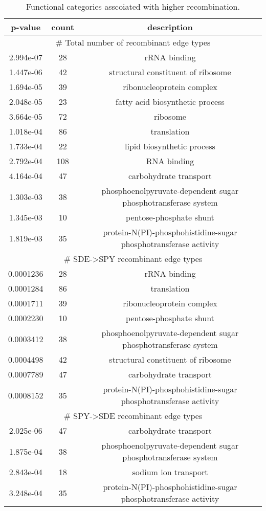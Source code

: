 \documentclass[english]{article}
\providecommand{\tabularnewline}{\\}
\begin{document}
\clearpage{}

%
\begin{table}
\caption{\label{tab:functional}Functional categories asscoiated with higher
recombination.}
\begin{tabular}{|c|c|c|}
\hline 
p-value & count & description\tabularnewline
\hline
\hline 
\multicolumn{3}{|c|}{\# Total number of recombinant edge types}\tabularnewline
\hline 
2.994e-07 &  28 & rRNA binding\tabularnewline
\hline 
1.447e-06 &  42 & structural constituent of ribosome\tabularnewline
\hline 
1.694e-05 &  39 & ribonucleoprotein complex\tabularnewline
\hline 
2.048e-05 &  23 & fatty acid biosynthetic process\tabularnewline
\hline 
3.664e-05 &  72 & ribosome\tabularnewline
\hline 
1.018e-04 &  86 & translation\tabularnewline
\hline 
1.733e-04 &  22 & lipid biosynthetic process\tabularnewline
\hline 
2.792e-04 & 108 & RNA binding\tabularnewline
\hline 
4.164e-04 &  47 & carbohydrate transport\tabularnewline
\hline 
1.303e-03 &  38 & phosphoenolpyruvate-dependent sugar phosphotransferase 
system\tabularnewline
\hline 
1.345e-03 &  10 & pentose-phosphate shunt\tabularnewline
\hline 
1.819e-03 &  35 & protein-N(PI)-phosphohistidine-sugar phosphotransferase 
activity\tabularnewline
\hline 
\multicolumn{3}{|c|}{\# SDE->SPY recombinant edge types}\tabularnewline
\hline 
0.0001236 & 28 & rRNA binding\tabularnewline
\hline 
0.0001284 & 86 & translation\tabularnewline
\hline 
0.0001711 & 39 & ribonucleoprotein complex\tabularnewline
\hline 
0.0002230 & 10 & pentose-phosphate shunt\tabularnewline
\hline 
0.0003412 & 38 & phosphoenolpyruvate-dependent sugar phosphotransferase 
system\tabularnewline
\hline 
0.0004498 & 42 & structural constituent of ribosome\tabularnewline
\hline 
0.0007789 & 47 & carbohydrate transport\tabularnewline
\hline 
0.0008152 & 35 & protein-N(PI)-phosphohistidine-sugar phosphotransferase 
activity\tabularnewline
\hline 
\multicolumn{3}{|c|}{\# SPY->SDE recombinant edge types}\tabularnewline
\hline 
2.025e-06 & 47 & carbohydrate transport\tabularnewline
\hline 
1.875e-04 & 38 & phosphoenolpyruvate-dependent sugar phosphotransferase 
system\tabularnewline
\hline 
2.843e-04 & 18 & sodium ion transport\tabularnewline
\hline 
3.248e-04 & 35 & protein-N(PI)-phosphohistidine-sugar phosphotransferase 
activity\tabularnewline
\hline
\end{tabular}


\end{table}


\clearpage{}%
\end{document}

